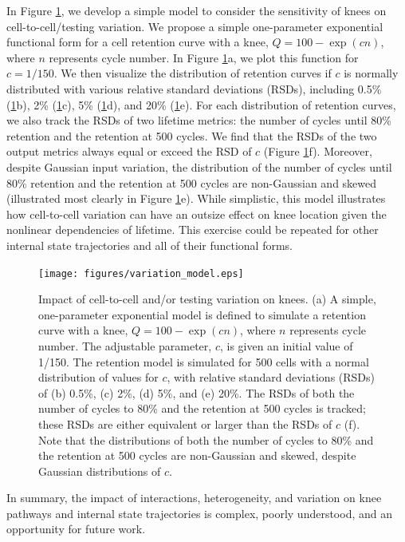 \documentclass[journal=jpclcd,manuscript=article]{achemso}
\begin{document}
In Figure \ref{fig:var_model}, we develop a simple model to consider the sensitivity of knees on cell-to-cell/testing variation. We propose a simple one-parameter exponential functional form for a cell retention curve with a knee, $Q=100 - \exp(cn)$, where $n$ represents cycle number. In Figure \ref{fig:var_model}a, we plot this function for $c=1/150$. We then visualize the distribution of retention curves if $c$ is normally distributed with various relative standard deviations (RSDs), including 0.5\% (\ref{fig:var_model}b), 2\% (\ref{fig:var_model}c), 5\% (\ref{fig:var_model}d), and 20\% (\ref{fig:var_model}e). For each distribution of retention curves, we also track the RSDs of two lifetime metrics: the number of cycles until 80\% retention and the retention at 500 cycles. We find that the RSDs of the two output metrics always equal or exceed the RSD of $c$ (Figure \ref{fig:var_model}f). Moreover, despite Gaussian input variation, the distribution of the number of cycles until 80\% retention and the retention at 500 cycles are non-Gaussian and skewed (illustrated most clearly in Figure \ref{fig:var_model}e). While simplistic, this model illustrates how cell-to-cell variation can have an outsize effect on knee location given the nonlinear dependencies of lifetime. This exercise could be repeated for other internal state trajectories and all of their functional forms.

\begin{figure}[ht!]
\centering
\texttt{[image: figures/variation\_model.eps]}
\caption{Impact of cell-to-cell and/or testing variation on knees.
(a) A simple, one-parameter exponential model is defined to simulate a retention curve with a knee, $Q=100 - \exp(cn)$, where $n$ represents cycle number.
The adjustable parameter, $c$, is given an initial value of 1/150.
The retention model is simulated for 500 cells with a normal distribution of values for $c$, with relative standard deviations (RSDs) of (b) 0.5\%, (c) 2\%, (d) 5\%, and (e) 20\%. The RSDs of both the number of cycles to 80\% and the retention at 500 cycles is tracked; these RSDs are either equivalent or larger than the RSDs of $c$ (f).
Note that the distributions of both the number of cycles to 80\% and the retention at 500 cycles are non-Gaussian and skewed, despite Gaussian distributions of $c$.}
\label{fig:var_model}
\end{figure}

In summary, the impact of interactions, heterogeneity, and variation on knee pathways and internal state trajectories is complex, poorly understood, and an opportunity for future work.
\end{document}
